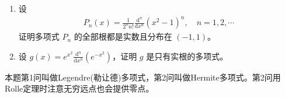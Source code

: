 \documentclass[../../main.tex]{subfiles}
\begin{document}
\begin{example}
\begin{enumerate}
\item 设
\begin{align}
P_n(x)=\frac{1}{2^n n!}\frac{\mathrm{d}^n}{\mathrm{d}x^n}(x^2 - 1)^n, \quad n = 1, 2, \cdots
\end{align}
证明多项式 \( P_n \) 的全部根都是实数且分布在 \( (-1, 1) \)。

\item 设 \( g(x)=e^{x^2}\frac{\mathrm{d}^n}{\mathrm{d}x^n}(e^{-x^2}) \)，证明 \( g \) 是只有实根的多项式。
\end{enumerate}
\end{example}
\begin{note}
本题第1问叫做Legendre(勒让德)多项式，第2问叫做Hermite多项式。第2问用Rolle定理时注意无穷远点也会提供零点。
\end{note}
\end{document}
